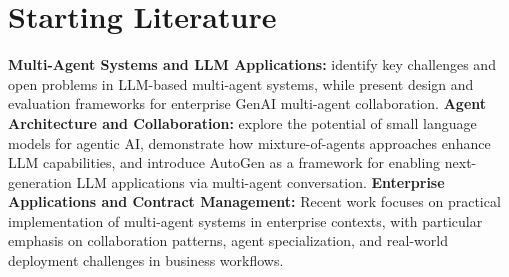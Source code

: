 
\section{Starting Literature}\label{section:starting_literature}

\textbf{Multi-Agent Systems and LLM Applications:} \cite{han2025llmmultiagentsystemschallenges} identify key challenges and open problems in LLM-based multi-agent systems, while \cite{shu2024effectivegenaimultiagentcollaboration} present design and evaluation frameworks for enterprise GenAI multi-agent collaboration.
\newline
\break
\textbf{Agent Architecture and Collaboration:} \cite{belcak2025smalllanguagemodelsfuture} explore the potential of small language models for agentic AI, \cite{wang2024mixtureofagentsenhanceslargelanguage} demonstrate how mixture-of-agents approaches enhance LLM capabilities, and \cite{wu2023autogenenablingnextgenllm} introduce AutoGen as a framework for enabling next-generation LLM applications via multi-agent conversation.
\newline
\break
\textbf{Enterprise Applications and Contract Management:} Recent work focuses on practical implementation of multi-agent systems in enterprise contexts, with particular emphasis on collaboration patterns, agent specialization, and real-world deployment challenges in business workflows.

